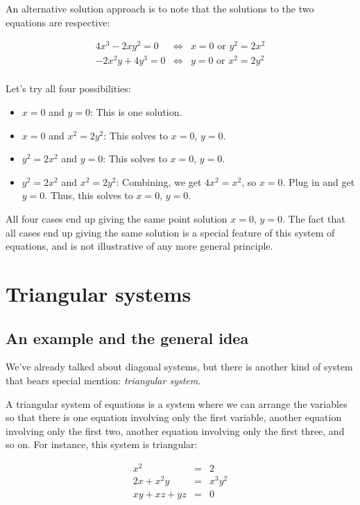 \documentclass[10pt]{amsart}
\begin{document}
An alternative solution approach is to note that the solutions to the two equations are respective:

\begin{eqnarray*}
  4x^3 - 2xy^2  = 0 & \iff & x = 0 \text{ or } y^2 = 2x^2\\
  -2x^2y + 4y^3 = 0 & \iff & y = 0 \text{ or } x^2 = 2y^2\\
\end{eqnarray*}

Let's try all four possibilities:

\begin{itemize}
\item $x = 0$ and $y = 0$: This is one solution.
\item $x = 0$ and $x^2 = 2y^2$: This solves to $x = 0$, $y = 0$.
\item $y^2 = 2x^2$ and $y = 0$: This solves to $x = 0$, $y = 0$.
\item $y^2 = 2x^2$ and $x^2 = 2y^2$: Combining, we get $4x^2 = x^2$,
  so $x = 0$. Plug in and get $y = 0$. Thus, this solves to $x = 0$, $y = 0$.
\end{itemize}

All four cases end up giving the same point solution $x = 0$, $y =
0$. The fact that all cases end up giving the same solution is a
special feature of this system of equations, and is not illustrative
of any more general principle.

\section{Triangular systems}

\subsection{An example and the general idea}

We've already talked about diagonal systems, but there is another kind
of system that bears special mention: {\em triangular system}.

A triangular system of equations is a system where we can arrange the
variables so that there is one equation involving only the first
variable, another equation involving only the first two, another
equation involving only the first three, and so on. For instance, this
system is triangular:

\begin{eqnarray*}
  x^2 & = & 2 \\
  2x + x^2y & = & x^3y^2\\
  xy + xz + yz & = & 0 \\
\end{eqnarray*}
\end{document}
